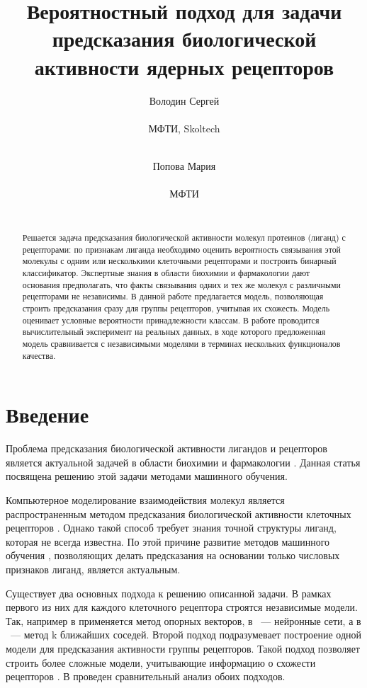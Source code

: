 \documentclass{ITaSconf}
\title{Вероятностный подход для задачи предсказания биологической активности ядерных рецепторов}
\author{
	Володин Сергей \\
	\begin{affiliation}
		МФТИ, Skoltech
	\end{affiliation}\\
	\email{sergei.volodin@phystech.edu}
	\and
	Попова Мария \\
	\begin{affiliation}
		МФТИ
	\end{affiliation}\\
	\email{maria\_popova@phystech.edu}
}
\begin{document}
	\maketitle
	\begin{abstract}
Решается задача предсказания биологической активности молекул протеинов (лиганд) с рецепторами: по признакам лиганда необходимо оценить вероятность связывания этой молекулы с одним или несколькими клеточными рецепторами и построить бинарный классификатор. Экспертные знания в области биохимии и фармакологии дают основания предполагать, что факты связывания одних и тех же молекул с различными рецепторами не независимы. В данной работе предлагается модель, позволяющая строить предсказания сразу для группы рецепторов, учитывая их схожесть. Модель оценивает условные вероятности принадлежности классам. В работе проводится вычислительный эксперимент на реальных данных, в ходе которого предложенная модель сравнивается с независимыми моделями в терминах нескольких функционалов качества.
	\end{abstract}

\section{Введение}
Проблема предсказания биологической активности лигандов и рецепторов является актуальной задачей в области биохимии и фармакологии \cite{hornak, Myint2012, Myint2015, vinay2008, Zhengjun5ht1a, laurent2008}. Данная статья посвящена решению этой задачи методами машинного обучения.

Компьютерное моделирование взаимодействия молекул является распространенным методом предсказания биологической активности клеточных рецепторов \cite{vinay2008, hornak}. Однако такой способ требует знания точной структуры лиганд, которая не всегда известна. По этой причине развитие методов машинного обучения \cite{peter1998}, позволяющих делать предсказания на основании только числовых признаков лиганд, является актуальным.

Существует два основных подхода к решению описанной задачи. В рамках первого из них для каждого клеточного рецептора строятся независимые модели. Так, например в \cite{svm, Zhengjun5ht1a} применяется метод опорных векторов, в \cite{Myint2012, Myint2015}~--- нейронные сети, а в \cite{scott2006}~--- метод k ближайших соседей. Второй подход подразумевает построение одной модели для предсказания активности группы рецепторов. Такой подход позволяет строить более сложные модели, учитывающие информацию о схожести рецепторов \cite{laurent2008}. В \cite{popova1} проведен сравнительный анализ обоих подходов.
\end{document}
